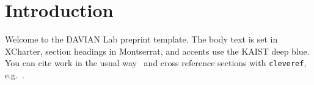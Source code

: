 \section{Introduction}
\label{sec:intro}
Welcome to the DAVIAN Lab preprint template. The body text is set in XCharter,
section headings in Montserrat, and accents use the KAIST deep blue. You can
cite work in the usual way~\cite{vaswani2017attention,he2016deep} and cross
reference sections with \texttt{cleveref}, e.g.\ .

\lipsum[1]
